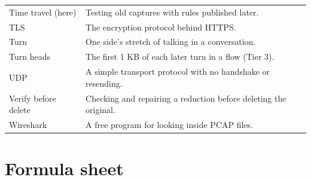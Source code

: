 {\begin{longtable}{>{\raggedright\arraybackslash}p{37mm} >{\raggedright\arraybackslash}p{116mm}}
Time travel (here) & Testing old captures with rules published later.\\
TLS & The encryption protocol behind HTTPS.\\
Turn & One side's stretch of talking in a conversation.\\
Turn heads & The first 1 KB of each later turn in a flow (Tier 3).\\
UDP & A simple transport protocol with no handshake or resending.\\
Verify before delete & Checking and repairing a reduction before deleting the original.\\
Wireshark & A free program for looking inside PCAP files.\\
\bottomrule
\end{longtable}}

\chapter{Formula sheet}

